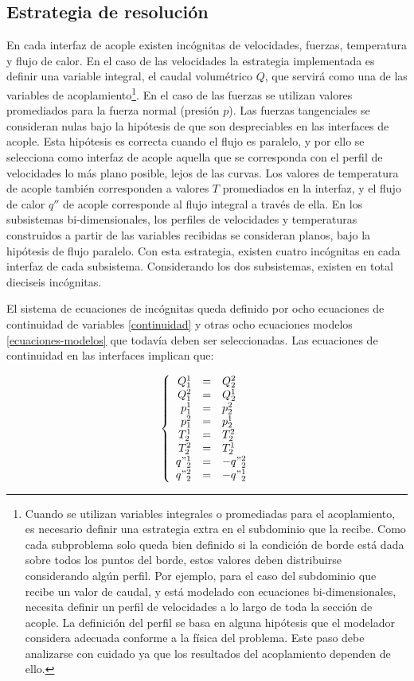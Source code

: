 \subsection*{Estrategia de resolución}

En cada interfaz de acople existen incógnitas de velocidades, fuerzas, temperatura y flujo de calor.
En el caso de las velocidades la estrategia implementada es definir una variable integral, 
el caudal volumétrico $Q$, que servirá como una de las variables de acoplamiento\footnote{
Cuando se utilizan variables integrales o promediadas para el acoplamiento, es necesario definir una estrategia extra en el subdominio que la recibe.
Como cada subproblema solo queda bien definido si la condición de borde está dada sobre todos los puntos del borde, estos valores deben distribuirse considerando algún perfil.
Por ejemplo, para el caso del subdominio que recibe un valor de caudal, y está modelado con ecuaciones bi-dimensionales, necesita definir un perfil de velocidades a lo largo de toda la sección de acople.
La definición del perfil se basa en alguna hipótesis que el modelador considera adecuada conforme a la física del problema.
Este paso debe analizarse con cuidado ya que los resultados del acoplamiento dependen de ello.
}.
En el caso de las fuerzas se utilizan valores promediados para la fuerza normal (presión $p$).
Las fuerzas tangenciales se consideran nulas bajo la hipótesis de que son despreciables en las interfaces de acople.
Esta hipótesis es correcta cuando el flujo es paralelo, 
y por ello se selecciona como interfaz de acople aquella que se corresponda con el perfil de velocidades lo más plano posible, lejos de las curvas.
Los valores de temperatura de acople también corresponden a valores $T$ promediados en la interfaz,
y el flujo de calor $q''$ de acople corresponde al flujo integral a través de ella.
En los subsistemas bi-dimensionales, los perfiles de velocidades y temperaturas construidos a partir de las variables recibidas se consideran planos,
bajo la hipótesis de flujo paralelo.
Con esta estrategia, existen cuatro incógnitas en cada interfaz de cada subsistema. 
Considerando los dos subsistemas, existen en total dieciseis incógnitas.

El sistema de ecuaciones de incógnitas queda definido por ocho ecuaciones de continuidad de variables \ref{continuidad}
y otras ocho ecuaciones modelos \ref{ecuaciones-modelos} que todavía deben ser seleccionadas.
Las ecuaciones de continuidad en las interfaces implican que:

\begin{equation}
\left\{ \begin{array}{rcl}
Q_1^1&=& Q_2^2 \\
Q_1^2&=& Q_2^1 \\
p_1^1&=& p_2^2 \\
p_1^2&=& p_2^1 \\
T_2^1&=& T_2^2 \\
T_2^2&=& T_2^1 \\
q"_2^1&=& - q"_2^2 \\
q"_2^2&=& - q"_2^1
\end{array}
\right.
\end{equation}

